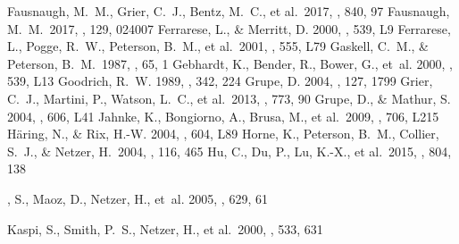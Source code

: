 \documentclass[iop]{emulateapj}
\begin{document}
\begin{thebibliography}{63}
 Fausnaugh, M.~M., Grier, C.~J., Bentz, M.~C., et al.\ 2017, \apj, 840, 97 
 Fausnaugh, M.~M.\ 2017, \pasp, 129, 024007 
{Ferrarese}, L., \& {Merritt}, D. 2000, \apjl, 539, L9
 Ferrarese, L., Pogge, 
R.~W., Peterson, B.~M., et al.\ 2001, \apjl, 555, L79
 Gaskell, C.~M., \& Peterson, B.~M.\ 1987, \apjs, 65, 1  
{Gebhardt}, K., {Bender}, R., {Bower}, G., {et~al.} 2000, \apjl, 539, L13
{Goodrich}, R.~W. 1989, \apj, 342, 224
{Grupe}, D. 2004, \aj, 127, 1799
 Grier, C.~J., Martini, 
P., Watson, L.~C., et al.\ 2013, \apj, 773, 90 
{Grupe}, D., \& {Mathur}, S. 2004, \apjl, 606, L41
 Jahnke, K., Bongiorno, 
A., Brusa, M., et al.\ 2009, \apjl, 706, L215 
{H{\"a}ring}, N., \& {Rix}, H.-W. 2004, \apjl, 604, L89
 Horne, K., Peterson, 
B.~M., Collier, S.~J., \& Netzer, H.\ 2004, \pasp, 116, 465 
 Hu, C., Du, P., Lu, K.-X., et al.\ 2015, \apj, 804, 138 

, S., {Maoz}, D., {Netzer}, H., {et~al.} 2005, \apj, 629, 61


 Kaspi, S., Smith, P.~S., Netzer, H., et al.\ 2000, \apj, 533, 631 



\end{thebibliography}
\end{document}
